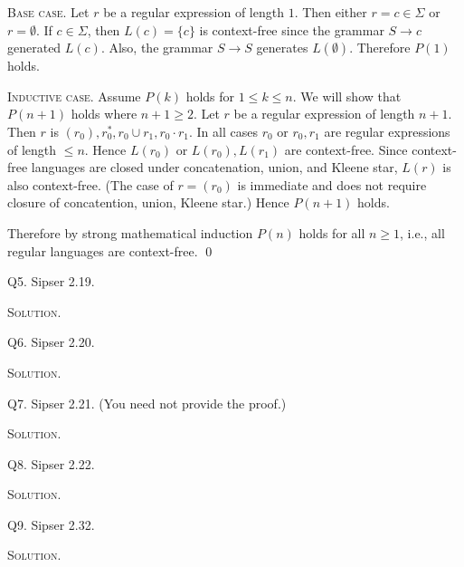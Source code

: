 \textsc{Base case}.
Let $r$ be a regular expression of length $1$.
Then either $r = c \in \Sigma$ or $r = \emptyset$.
If $c \in \Sigma$, then $L(c) = \{c\}$ is context-free since
the grammar $S \rightarrow c$ generated $L(c)$.
Also, the grammar $S \rightarrow S$ generates $L(\emptyset)$.
Therefore $P(1)$ holds.

\textsc{Inductive case}.
Assume $P(k)$ holds for $1 \leq k \leq n$.
We will show that $P(n + 1)$ holds where $n + 1 \geq 2$.
Let $r$ be a regular expression of length $n + 1$.
Then $r$ is $(r_0), r_0^*, r_0 \cup r_1, r_0 \cdot r_1$.
In all cases $r_0$ or $r_0, r_1$ are regular expressions of length $\leq n$.
Hence $L(r_0)$ or $L(r_0), L(r_1)$ are context-free.
Since context-free languages are closed under concatenation, union, and Kleene star,
$L(r)$ is also context-free.
(The case of $r = (r_0)$ is immediate and does not require closure of concatention, union, Kleene star.)
Hence $P(n + 1)$ holds.

Therefore by strong mathematical induction $P(n)$ holds for all $n \geq 1$, i.e.,
all regular languages are context-free.
\qed

\newpage
Q5. Sipser 2.19.

\textsc{Solution}.



\newpage
Q6. Sipser 2.20.

\textsc{Solution}.



\newpage
Q7. Sipser 2.21.
(You need not provide the proof.)

\textsc{Solution}.



\newpage
Q8. Sipser 2.22.

\textsc{Solution}.



\newpage
Q9. Sipser 2.32.

\textsc{Solution}.




